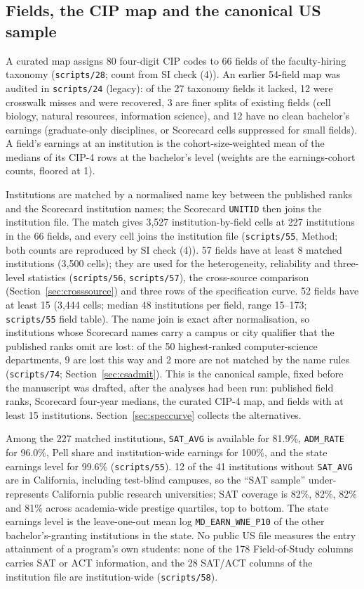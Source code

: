 \documentclass[11pt]{article}
\newcommand{\scr}[1]{\texttt{scripts/#1}}
\begin{document}
\subsection{Fields, the CIP map and the canonical US sample}\label{sec:fields}

A curated map assigns 80 four-digit CIP codes to 66 fields of the faculty-hiring taxonomy (\scr{28}; count from SI
check (4)). An earlier 54-field map was audited in \scr{24} (legacy): of the 27 taxonomy fields it lacked, 12 were
crosswalk misses and were recovered, 3 are finer splits of existing fields (cell biology, natural resources,
information science), and 12 have no clean bachelor's earnings (graduate-only disciplines, or Scorecard cells
suppressed for small fields). A field's earnings at an institution is the cohort-size-weighted mean of the
medians of its CIP-4 rows at the bachelor's level (weights are the earnings-cohort counts, floored at 1).

Institutions are matched by a normalised name key between the published ranks and the Scorecard institution
names; the Scorecard \texttt{UNITID} then joins the institution file. The match gives 3,527
institution-by-field cells at 227 institutions in the 66 fields, and every cell joins the institution file
(\scr{55}, Method; both counts are reproduced by SI check (4)). 57 fields have at least 8 matched institutions (3,500 cells); they are
used for the heterogeneity, reliability and three-level statistics (\scr{56}, \scr{57}), the cross-source
comparison (Section~\ref{sec:crosssource}) and three rows of the specification curve. 52 fields have at least
15 (3,444 cells; median 48 institutions per field, range 15--173; \scr{55} field table). The name join is
exact after normalisation, so institutions whose Scorecard names carry a campus or city qualifier that the
published ranks omit are lost: of the 50 highest-ranked computer-science departments, 9 are lost this way and 2
more are not matched by the name rules (\scr{74}; Section~\ref{sec:csadmit}). This is the canonical
sample, fixed before the manuscript was drafted, after the analyses had been run: published field ranks,
Scorecard four-year medians, the curated CIP-4 map, and fields with at least 15 institutions.
Section~\ref{sec:speccurve} collects the alternatives.

Among the 227 matched institutions, \texttt{SAT\_AVG} is available for 81.9\%, \texttt{ADM\_RATE} for 96.0\%,
Pell share and institution-wide earnings for 100\%, and the state earnings level for 99.6\% (\scr{55}). 12 of
the 41 institutions without \texttt{SAT\_AVG} are in California, including test-blind campuses, so the ``SAT
sample'' under-represents California public research universities; SAT coverage is 82\%, 82\%, 82\% and 81\%
across academia-wide prestige quartiles, top to bottom. The state earnings level is the leave-one-out mean log
\texttt{MD\_EARN\_WNE\_P10} of the other bachelor's-granting institutions in the state. No public US file
measures the entry attainment of a program's own students: none of the 178 Field-of-Study columns carries SAT
or ACT information, and the 28 SAT/ACT columns of the institution file are institution-wide (\scr{58}).
\end{document}
